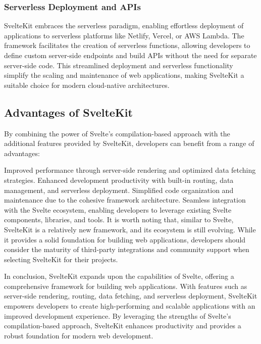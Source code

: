 \subsubsection{Serverless Deployment and APIs}

SvelteKit embraces the serverless paradigm, enabling effortless deployment of applications to serverless platforms like Netlify, Vercel, or AWS Lambda. The framework facilitates the creation of serverless functions, allowing developers to define custom server-side endpoints and build APIs without the need for separate server-side code. This streamlined deployment and serverless functionality simplify the scaling and maintenance of web applications, making SvelteKit a suitable choice for modern cloud-native architectures.

\subsection{Advantages of SvelteKit}

By combining the power of Svelte's compilation-based approach with the additional features provided by SvelteKit, developers can benefit from a range of advantages:

Improved performance through server-side rendering and optimized data fetching strategies.
Enhanced development productivity with built-in routing, data management, and serverless deployment.
Simplified code organization and maintenance due to the cohesive framework architecture.
Seamless integration with the Svelte ecosystem, enabling developers to leverage existing Svelte components, libraries, and tools.
It is worth noting that, similar to Svelte, SvelteKit is a relatively new framework, and its ecosystem is still evolving. While it provides a solid foundation for building web applications, developers should consider the maturity of third-party integrations and community support when selecting SvelteKit for their projects.

In conclusion, SvelteKit expands upon the capabilities of Svelte, offering a comprehensive framework for building web applications. With features such as server-side rendering, routing, data fetching, and serverless deployment, SvelteKit empowers developers to create high-performing and scalable applications with an improved development experience. By leveraging the strengths of Svelte's compilation-based approach, SvelteKit enhances productivity and provides a robust foundation for modern web development.
